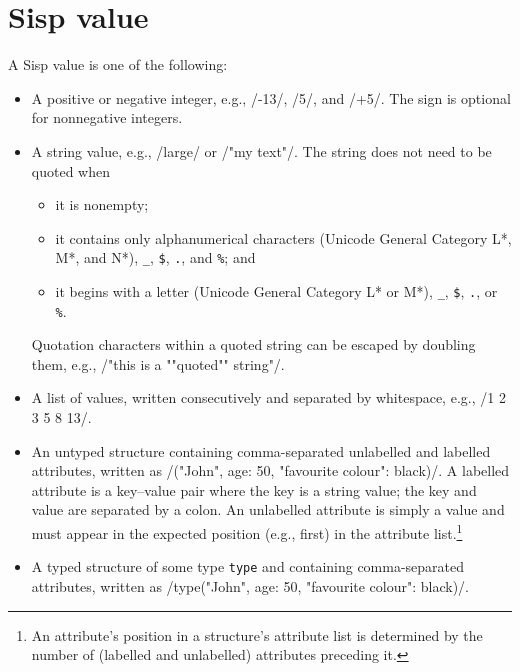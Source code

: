 \documentclass[main.tex]{subfiles}
\begin{document}
\section*{Sisp value}
A Sisp value is one of the following:
\begin{itemize}
	
	\item A positive or negative integer, e.g., \iil/-13/, \iil/5/, and \iil/+5/. The sign is optional for nonnegative integers.
	
	\item A string value, e.g., \iil/large/ or \iil/"my text"/. The string does not need to be quoted when
	\begin{itemize}[nosep]
		\item it is nonempty;
		\item it contains only alphanumerical characters (Unicode General Category L*, M*, and N*), \texttt{_}, \texttt{\$}, \texttt{.}, and \texttt{\%}; and
		\item it begins with a letter (Unicode General Category L* or M*), \texttt{_}, \texttt{\$}, \texttt{.}, or \texttt{\%}.
	\end{itemize}
	Quotation characters within a quoted string can be escaped by doubling them, e.g., \iil/"this is a ""quoted"" string"/.
	
	\item A list of values, written consecutively and separated by whitespace, e.g., \iil/1 2 3 5 8 13/.
	
	\item An untyped structure containing comma-separated unlabelled and labelled attributes, written as \iil/("John", age: 50, "favourite colour": black)/. A labelled attribute is a key–value pair where the key is a string value; the key and value are separated by a colon. An unlabelled attribute is simply a value and must appear in the expected position (e.g., first) in the attribute list.\footnote{An attribute's position in a structure's attribute list is determined by the number of (labelled and unlabelled) attributes preceding it.}
	
	\item A typed structure of some type \texttt{type} and containing comma-separated attributes, written as \iil/type("John", age: 50, "favourite colour": black)/.
	
\end{itemize}
\end{document}
